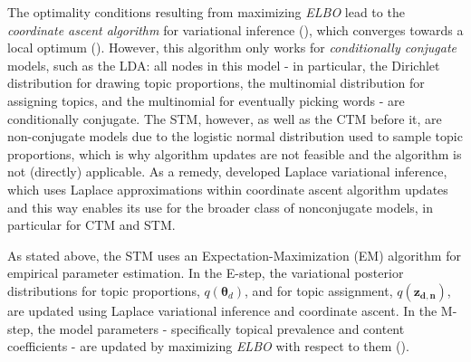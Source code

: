 \documentclass[12pt]{article}
\begin{document}
The optimality conditions resulting from maximizing \textit{ELBO} lead to the \textit{coordinate ascent algorithm} for variational inference (\citealp{wang2013variational}), which converges towards a local optimum (\citealp{bishop2006pattern}). However, this algorithm only works for \textit{conditionally conjugate} models, such as the LDA: all nodes in this model - in particular, the Dirichlet distribution for drawing topic proportions, the multinomial distribution for assigning topics, and the multinomial for eventually picking words - are conditionally conjugate. The STM, however, as well as the CTM before it, are non-conjugate models due to the logistic normal distribution used to sample topic proportions, which is why algorithm updates are not feasible and the algorithm is not (directly) applicable. As a remedy, \cite{wang2013variational} developed Laplace variational inference, which uses Laplace approximations within coordinate ascent algorithm updates and this way enables its use for the broader class of nonconjugate models, in particular for CTM and STM.

As stated above, the STM uses an Expectation-Maximization (EM) algorithm for empirical parameter estimation. In the E-step, the variational posterior distributions for topic proportions, $q(\boldsymbol{\theta}_d)$, and for topic assignment, $q(\boldsymbol{z_{d,n}})$, are updated using Laplace variational inference and coordinate ascent. In the M-step, the model parameters - specifically topical prevalence and content coefficients - are updated by maximizing \textit{ELBO} with respect to them (\citealp{roberts2016model}).



\end{document}
